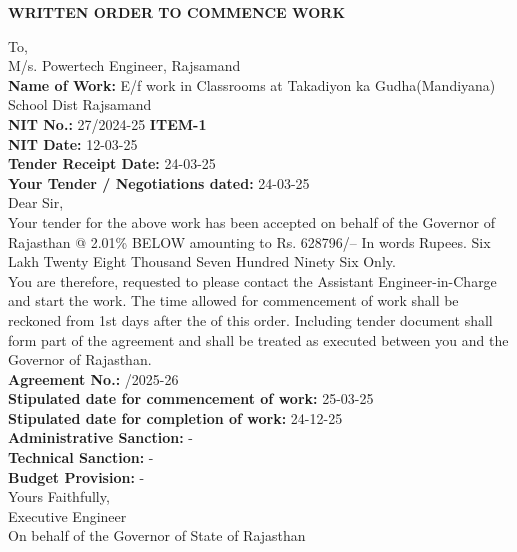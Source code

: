 \documentclass[a4paper]{article}
\begin{document}
\begin{center}
    \textbf{WRITTEN ORDER TO COMMENCE WORK}
\end{center}

To, \\
M/s. Powertech Engineer, Rajsamand \\

\vspace{0.5cm}
\textbf{Name of Work:} E/f work in Classrooms at Takadiyon ka Gudha(Mandiyana) School Dist Rajsamand \\
\textbf{NIT No.:} 27/2024-25 \quad \textbf{ITEM-1} \\
\textbf{NIT Date:} 12-03-25 \\
\textbf{Tender Receipt Date:} 24-03-25 \\
\textbf{Your Tender / Negotiations dated:} 24-03-25 \\

Dear Sir, \\

Your tender for the above work has been accepted on behalf of the Governor of Rajasthan @ 2.01\% BELOW amounting to Rs. 628796/-- In words Rupees. Six Lakh Twenty Eight Thousand Seven Hundred Ninety Six Only. \\

You are therefore, requested to please contact the Assistant Engineer-in-Charge and start the work. The time allowed for commencement of work shall be reckoned from 1st days after the of this order. Including tender document shall form part of the agreement and shall be treated as executed between you and the Governor of Rajasthan. \\

\textbf{Agreement No.:} /2025-26 \\
\textbf{Stipulated date for commencement of work:} 25-03-25 \\
\textbf{Stipulated date for completion of work:} 24-12-25 \\
\textbf{Administrative Sanction:} - \\
\textbf{Technical Sanction:} - \\
\textbf{Budget Provision:} - \\

Yours Faithfully, \\
\vspace{0.5cm}
Executive Engineer \\
On behalf of the Governor of State of Rajasthan \\
\end{document}
